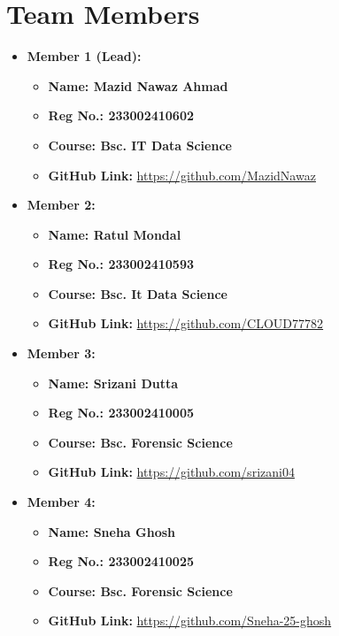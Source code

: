 \documentclass[a4paper,12pt]{article}
\begin{document}
\section*{Team Members}
\begin{itemize}[leftmargin=1.5cm]
    \item \textbf{Member 1 (Lead):} 
    \begin{itemize}[leftmargin=1.5cm]
        \item \textbf{Name: Mazid Nawaz Ahmad} 
        \item \textbf{Reg No.: 233002410602} 
        \item \textbf{Course: Bsc. IT Data Science} 
        \item \textbf{GitHub Link:} \url{https://github.com/MazidNawaz}
    \end{itemize}

    \item \textbf{Member 2:} 
    \begin{itemize}[leftmargin=1.5cm]
        \item \textbf{Name: Ratul Mondal} 
        \item \textbf{Reg No.: 233002410593} 
        \item \textbf{Course: Bsc. It Data Science} 
        \item \textbf{GitHub Link:} \url{https://github.com/CLOUD77782}
    \end{itemize}

    \item \textbf{Member 3:} 
    \begin{itemize}[leftmargin=1.5cm]
        \item \textbf{Name: Srizani Dutta} 
        \item \textbf{Reg No.: 233002410005} 
        \item \textbf{Course: Bsc. Forensic Science} 
        \item \textbf{GitHub Link:} \url{https://github.com/srizani04}
    \end{itemize}

    \item \textbf{Member 4:} 
    \begin{itemize}[leftmargin=1.5cm]
        \item \textbf{Name: Sneha Ghosh} 
        \item \textbf{Reg No.: 233002410025} 
        \item \textbf{Course: Bsc. Forensic Science} 
        \item \textbf{GitHub Link:} \url{https://github.com/Sneha-25-ghosh}
    \end{itemize}


\end{itemize}
\end{document}
